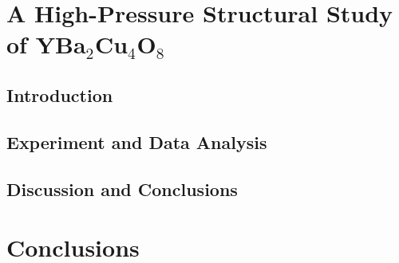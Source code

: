 \section{A High-Pressure Structural Study of YBa$_2$Cu$_4$O$_8$}

\subsection{Introduction}

\subsection{Experiment and Data Analysis}

\subsection{Discussion and Conclusions}

\section{Conclusions}
